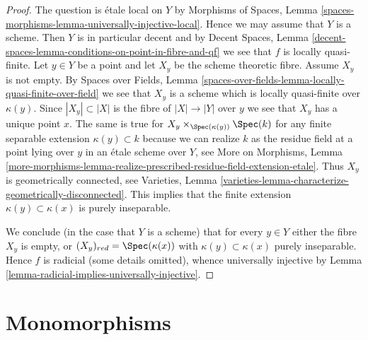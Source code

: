 \begin{proof}
The question is \'etale local on $Y$ by
Morphisms of Spaces, Lemma
\ref{spaces-morphisms-lemma-universally-injective-local}.
Hence we may assume that $Y$ is a scheme.
Then $Y$ is in particular decent and by Decent Spaces, Lemma
\ref{decent-spaces-lemma-conditions-on-point-in-fibre-and-qf}
we see that $f$ is locally quasi-finite.
Let $y \in Y$ be a point and let $X_y$ be the scheme theoretic
fibre. Assume $X_y$ is not empty. By Spaces over Fields, Lemma
\ref{spaces-over-fields-lemma-locally-quasi-finite-over-field}
we see that $X_y$ is a scheme which is locally quasi-finite over
$\kappa(y)$. Since $|X_y| \subset |X|$ is the fibre of $|X| \to |Y|$
over $y$ we see that $X_y$ has a unique point $x$. The same is true
for $X_y \times_{\Spec(\kappa(y))} \Spec(k)$ for any
finite separable extension $\kappa(y) \subset k$
because we can realize $k$ as the residue field at a point
lying over $y$ in an \'etale scheme over $Y$,
see More on Morphisms, Lemma
\ref{more-morphisms-lemma-realize-prescribed-residue-field-extension-etale}.
Thus $X_y$ is geometrically connected, see
Varieties, Lemma \ref{varieties-lemma-characterize-geometrically-disconnected}.
This implies that the finite extension $\kappa(y) \subset \kappa(x)$
is purely inseparable.

\medskip\noindent
We conclude (in the case that $Y$ is a scheme)
that for every $y \in Y$ either the fibre $X_y$ is empty,
or $(X_y)_{red} = \Spec(\kappa(x))$ with
$\kappa(y) \subset \kappa(x)$ purely inseparable.
Hence $f$ is radicial (some details omitted), whence universally injective by
Lemma \ref{lemma-radicial-implies-universally-injective}.
\end{proof}




\section{Monomorphisms}
\label{section-monomorphisms}

